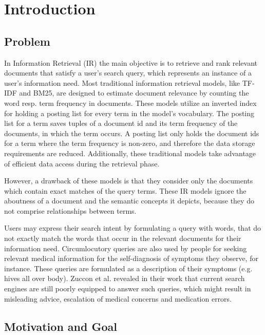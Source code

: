 \chapter{Introduction}

\section{Problem}

In Information Retrieval (IR) the main objective is to retrieve and rank relevant documents that satisfy a user’s search query, which represents an instance of a user’s information need.
Most traditional information retrieval models, like TF-IDF and BM25, are designed to estimate document relevance by counting the word resp. term frequency in documents.
These models utilize an inverted index for holding a posting list for every term in the model’s vocabulary.
The posting list for a term saves tuples of a document id and its term frequency of the documents, in which the term occurs.
A posting list only holds the document ids for a term where the term frequency is non-zero, and therefore the data storage requirements are reduced.
Additionally, these traditional models take advantage of efficient data access during the retrieval phase.

However, a drawback of these models is that they consider only the documents which contain exact matches of the query terms.
These IR models ignore the aboutness of a document and the semantic concepts it depicts, because they do not comprise relationships between terms. \cite{mitra:2018:introduction-neural-ir}

Users may express their search intent by formulating a query with words, that do not exactly match the words that occur in the relevant documents for their information need.
Circumlocutory queries are also used by people for seeking relevant medical information for the self-diagnosis of symptoms they observe, for instance.
These queries are formulated as a description of their symptoms (e.g. hives all over body). 
Zuccon et al. revealed in their work \cite{zuccon:2015:diagnose-this} that current search engines are still poorly equipped to answer such queries, which might result in misleading advice, escalation of medical concerns and medication errors.


\section{Motivation and Goal}

